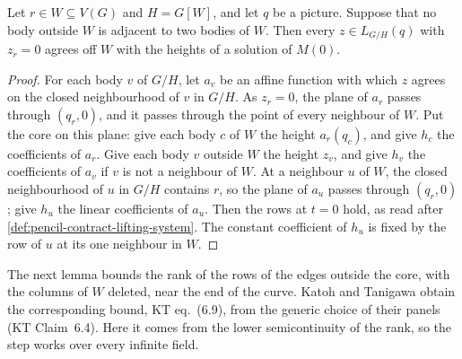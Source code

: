 \begin{lemma}
  \label{lem:pencil-contract-limit}
  \leanok
  Let $r \in W \subseteq V(G)$ and $H = G[W]$, and let $q$ be a picture.
  Suppose that no body outside $W$ is adjacent to two bodies of $W$. Then
  every $z \in L_{G/H}(q)$ with $z_r = 0$ agrees off $W$ with the heights
  of a solution of $M(0)$.
\end{lemma}
\begin{proof}
  \leanok
  For each body $v$ of $G/H$, let $a_v$ be an affine function with
  which $z$ agrees on the closed neighbourhood of $v$ in $G/H$. As
  $z_r = 0$, the plane of $a_r$ passes through $(q_r, 0)$, and it passes
  through the point of every neighbour of $W$. Put the core on this plane:
  give each body $c$ of $W$ the height $a_r(q_c)$, and give $h_c$ the
  coefficients of $a_r$. Give each body $v$ outside $W$ the height $z_v$,
  and give $h_v$ the coefficients of $a_v$ if $v$ is not a neighbour of
  $W$. At a neighbour $u$ of $W$, the closed neighbourhood of $u$ in $G/H$
  contains $r$, so the plane of $a_u$ passes through $(q_r, 0)$; give
  $h_u$ the linear coefficients of $a_u$. Then the rows at $t = 0$ hold,
  as read after \cref{def:pencil-contract-lifting-system}. The constant
  coefficient of $h_u$ is fixed by the row of $u$ at its one neighbour in
  $W$.
\end{proof}

The next lemma bounds the rank of the rows of the edges outside the
core, with the columns of $W$ deleted, near the end of the curve. Katoh and Tanigawa
obtain the corresponding bound, KT eq.~(6.9), from the generic choice of
their panels (KT Claim~6.4). Here it comes from the lower semicontinuity
of the rank, so the step works over every infinite field.

